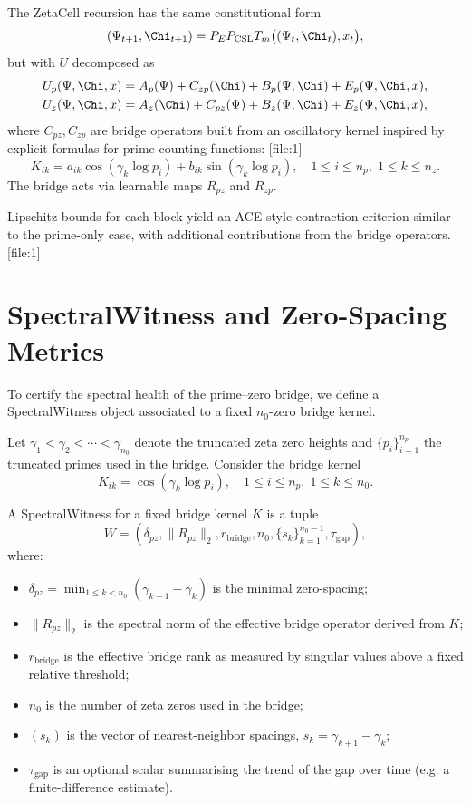 \documentclass[11pt]{article}
\begin{document}
The ZetaCell recursion has the same constitutional form
\[
  (\Psi_{t+1}, \Chi_{t+1})
  = P_E P_{\mathrm{CSL}} T_m\bigl((\Psi_t,\Chi_t), x_t\bigr),
\]
but with $U$ decomposed as
\begin{align*}
  U_p(\Psi,\Chi,x) &= A_p(\Psi) + C_{zp}(\Chi) + B_p(\Psi,\Chi) + E_{p}(\Psi,\Chi, x),\\
  U_z(\Psi,\Chi,x) &= A_z(\Chi) + C_{pz}(\Psi) + B_z(\Psi,\Chi) + E_{z}(\Psi,\Chi, x),
\end{align*}
where $C_{pz}, C_{zp}$ are bridge operators built from an oscillatory
kernel inspired by explicit formulas for prime-counting functions:%
[file:1]
\[
  K_{ik} = a_{ik} \cos(\gamma_k \log p_i) + b_{ik} \sin(\gamma_k \log p_i),
  \quad 1 \le i \le n_p,\; 1 \le k \le n_z.
\]
The bridge acts via learnable maps $R_{pz}$ and $R_{zp}$.

Lipschitz bounds for each block yield an ACE-style contraction criterion
similar to the prime-only case, with additional contributions from the
bridge operators.%
[file:1]

\section{SpectralWitness and Zero-Spacing Metrics}

To certify the spectral health of the prime--zero bridge, we define a
SpectralWitness object associated to a fixed $n_0$-zero bridge kernel.

Let $\gamma_1 < \gamma_2 < \cdots < \gamma_{n_0}$ denote the truncated
zeta zero heights and $\{p_i\}_{i=1}^{n_p}$ the truncated primes used in
the bridge. Consider the bridge kernel
\[
  K_{ik} = \cos(\gamma_k \log p_i),
  \quad 1 \le i \le n_p,\; 1 \le k \le n_0.
\]

\begin{definition}[SpectralWitness]
A SpectralWitness for a fixed bridge kernel $K$ is a tuple
\[
  W = (\delta_{pz}, \|R_{pz}\|_2, r_{\mathrm{bridge}}, n_0,
       \{s_k\}_{k=1}^{n_0-1}, \tau_{\mathrm{gap}}),
\]
where:
\begin{itemize}[leftmargin=*]
  \item $\delta_{pz} = \min_{1 \le k < n_0} (\gamma_{k+1}-\gamma_k)$ is the
        minimal zero-spacing;
  \item $\|R_{pz}\|_2$ is the spectral norm of the effective bridge operator
        derived from $K$;
  \item $r_{\mathrm{bridge}}$ is the effective bridge rank as measured by
        singular values above a fixed relative threshold;
  \item $n_0$ is the number of zeta zeros used in the bridge;
  \item $(s_k)$ is the vector of nearest-neighbor spacings,
        $s_k = \gamma_{k+1}-\gamma_k$;
  \item $\tau_{\mathrm{gap}}$ is an optional scalar summarising the trend
        of the gap over time (e.g. a finite-difference estimate).
\end{itemize}
\end{definition}
\end{document}
